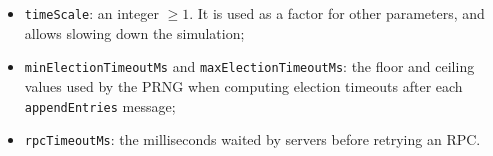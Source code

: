 \begin{itemize}
    \item \texttt{timeScale}: an integer $\ge 1$. It is used as a factor for other parameters, and allows slowing down the simulation;
    \item \texttt{minElectionTimeoutMs} and \texttt{maxElectionTimeoutMs}: the floor and ceiling values used by the PRNG when computing election timeouts after each \texttt{appendEntries} message;
    \item \texttt{rpcTimeoutMs}: the milliseconds waited by servers before retrying an RPC.
\end{itemize}

\clearpage
\newpage
